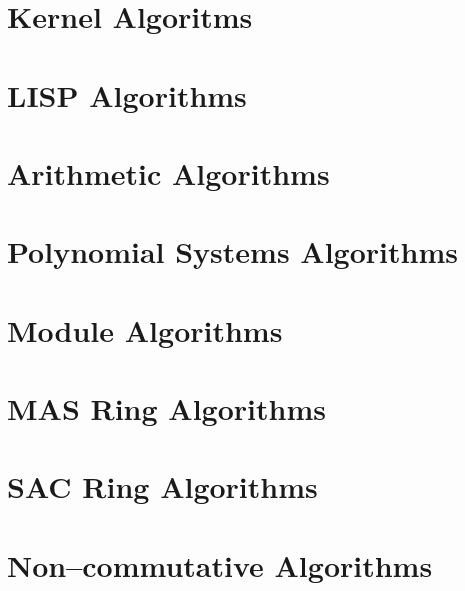 
\sloppy

\chapter{Kernel Algoritms}
{\small

}

\chapter{LISP Algorithms}
{\small

}

\chapter{Arithmetic Algorithms}
{\small

}

\chapter{Polynomial Systems Algorithms}
{\small

}

\chapter{Module Algorithms}
{\small

}

\chapter{MAS Ring Algorithms}
{\small

}

\chapter{SAC Ring Algorithms}
{\small

}

\chapter{Non--commutative Algorithms}
{\small

}

\fussy
